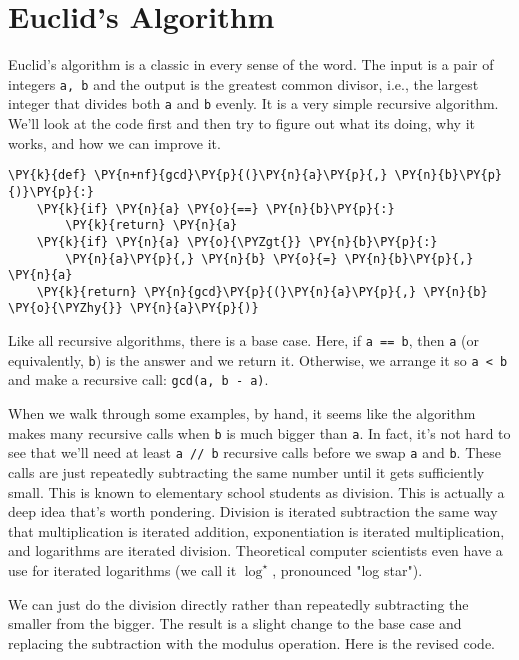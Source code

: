 \section{Euclid's Algorithm}


Euclid's algorithm is a classic in every sense of the word.
The input is a pair of integers \texttt{a, b} and the output is the greatest common divisor, i.e., the largest integer that divides both \texttt{a} and \texttt{b} evenly.
It is a very simple recursive algorithm.
We'll look at the code first and then try to figure out what its doing, why it works, and how we can improve it.

\begin{Verbatim}[commandchars=\\\{\}]
\PY{k}{def} \PY{n+nf}{gcd}\PY{p}{(}\PY{n}{a}\PY{p}{,} \PY{n}{b}\PY{p}{)}\PY{p}{:}
    \PY{k}{if} \PY{n}{a} \PY{o}{==} \PY{n}{b}\PY{p}{:}
        \PY{k}{return} \PY{n}{a}
    \PY{k}{if} \PY{n}{a} \PY{o}{\PYZgt{}} \PY{n}{b}\PY{p}{:}
        \PY{n}{a}\PY{p}{,} \PY{n}{b} \PY{o}{=} \PY{n}{b}\PY{p}{,} \PY{n}{a}
    \PY{k}{return} \PY{n}{gcd}\PY{p}{(}\PY{n}{a}\PY{p}{,} \PY{n}{b} \PY{o}{\PYZhy{}} \PY{n}{a}\PY{p}{)}
\end{Verbatim}



Like all recursive algorithms, there is a base case.
Here, if \texttt{a == b}, then \texttt{a} (or equivalently, \texttt{b}) is the answer and we return it.
Otherwise, we arrange it so \texttt{a < b} and make a recursive call: \texttt{gcd(a, b - a)}.


When we walk through some examples, by hand, it seems like the algorithm makes many recursive calls when \texttt{b} is much bigger than \texttt{a}.
In fact, it's not hard to see that we'll need at least \texttt{a // b} recursive calls before we swap \texttt{a} and \texttt{b}.
These calls are just repeatedly subtracting the same number until it gets sufficiently small.
This is known to elementary school students as division.
This is actually a deep idea that's worth pondering.  Division is iterated subtraction the same way that multiplication is iterated addition, exponentiation is iterated multiplication, and logarithms are iterated division.
Theoretical computer scientists even have a use for iterated logarithms (we call it $\log^\star$, pronounced "log star").


We can just do the division directly rather than repeatedly subtracting the smaller from the bigger.
The result is a slight change to the base case and replacing the subtraction with the modulus operation.
Here is the revised code.


